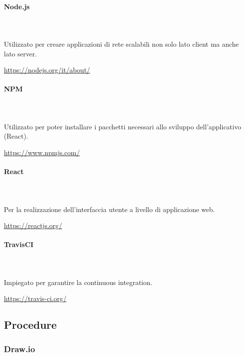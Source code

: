 	\paragraph{Node.js}\mbox{} \\ \mbox{} \\
	Utilizzato per creare applicazioni di rete scalabili non solo lato client ma anche lato server.
	\\
	\centerline{\url{https://nodejs.org/it/about/}}
	\paragraph{NPM}\mbox{} \\ \mbox{} \\
	Utilizzato per poter installare i pacchetti necessari allo sviluppo dell’applicativo (React\glo).
	\\
	\centerline{\url{https://www.npmjs.com/}}
	\paragraph{React}\mbox{} \\ \mbox{} \\
	Per la realizzazione dell’interfaccia utente a livello di applicazione web.\\
	\centerline{\url{https://reactjs.org/}}
	\paragraph{TravisCI}\mbox{} \\ \mbox{} \\
	Impiegato per garantire la continuous integration.
	\\
	\centerline{\url{https://travis-ci.org/}}
	\subsection{Procedure}
	\subsubsection{Draw.io}
